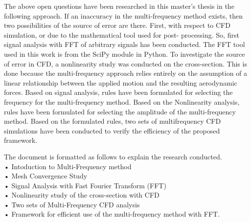 \documentclass[a4paper, 12pt]{report}
\begin{document}
The above open questions have been researched in this master's thesis in the following approach. 
If an inaccuracy in the multi-frequency method exists, then two possibilities of the source of error 
are there. First, with respect to CFD simulation, or due to the mathematical tool used for post-
processing. So, first signal analysis with FFT of arbitrary signals has been conducted. The FFT tool 
used in this work is from the SciPy module in Python. To investigate the source of error in CFD, a 
nonlinearity study was conducted on the cross-section. This is done because the multi-frequency 
approach relies entirely on the assumption of a linear relationship between the applied motion and 
the resulting aerodynamic forces. Based on signal analysis, rules have been formulated for selecting 
the frequency for the multi-frequency method. Based on the Nonlinearity analysis, rules have been 
formulated for selecting the amplitude of the multi-frequency method. Based on the formulated 
rules, two sets of multifrequency CFD simulations have been conducted to verify the efficiency of 
the proposed framework.   
\vspace{0.5 cm}

\begin{flushleft}   
The document is formatted as follows to explain the research conducted. \\
\hspace{2cm}• Intoduction to Multi-Frequency method   \\
\hspace{2cm}• Mesh Convergence Study \\
\hspace{2cm}• Signal Analysis with Fast Fourier Transform (FFT) \\
\hspace{2cm}• Nonlinearity study of the cross-section with CFD  \\
\hspace{2cm}• Two sets of Multi-Frequency CFD analysis  \\
\hspace{2cm}• Framework for efficient use of the multi-frequency method with FFT.  \\
\end{flushleft}
\end{document}
